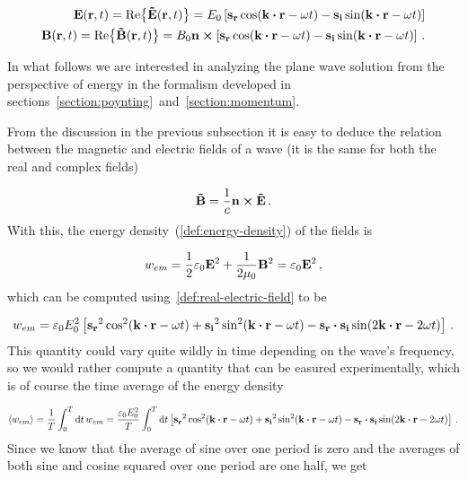 \documentclass[12pt, class=report, crop=false]{standalone}
\begin{document}
\begin{subequations}
  \begin{align}
    \label{def:real-electric-field}
    \vb{E}(\vb{r},t) = \Re{\vb{\tilde{E}}(\vb{r},t)} = E_0 \left[\vb{s_r} \cos(\vb{k}\vdot\vb{r} - \omega t) - \vb{s_i} \sin(\vb{k}\vdot\vb{r} - \omega t) \right] \\
    \vb{B}(\vb{r},t) = \Re{\vb{\tilde{B}}(\vb{r},t)} = B_0 \vb{n}\cp\left[\vb{s_r} \cos(\vb{k}\vdot\vb{r} - \omega t) - \vb{s_i} \sin(\vb{k}\vdot\vb{r} - \omega t) \right] \,.
  \end{align}
\end{subequations}

\par
In what follows we are interested in analyzing the plane wave solution from the perspective of energy in the formalism developed in sections~\ref{section:poynting}~and~\ref{section:momentum}.

\par
From the discussion in the previous subsection it is easy to deduce the relation between the magnetic and electric fields of a wave (it is the same for both the real and complex fields)

\begin{equation}
  \label{othogonality-of-fields}
  \vb{\tilde{B}} = \frac{1}{c} \vb{n}\cp\vb{\tilde{E}} \,.
\end{equation}
With this, the energy density~(\ref{def:energy-density}) of the fields is

\begin{equation}
  w_{em} = \frac{1}{2} \varepsilon_0 \vb{E}^2+ \frac{1}{2\mu_0} \vb{B}^2 = \varepsilon_0 \vb{E}^2 \,,
\end{equation}
which can be computed using~\cref{def:real-electric-field} to be

\begin{equation}
  w_{em} = \varepsilon_0 E_{0}^{2} \left[ \vb{s_r}^2 \cos[2](\vb{k}\vdot\vb{r}-\omega t) + \vb{s_i}^2 \sin[2](\vb{k}\vdot\vb{r}-\omega t) - \vb{s_r}\vdot\vb{s_i} \sin(2\vb{k}\vdot \vb{r} - 2 \omega t) \right] \,.
\end{equation}
This quantity could vary quite wildly in time depending on the wave's frequency, so we would rather compute a quantity that can be easured experimentally, which is of course the time average of the energy density

\begin{equation}
  \expval{w_{em}} = \frac{1}{T} \int_{0}^{T} \dd{t} w_{em} = \frac{\varepsilon_0 E_0^2}{T} \int_{0}^{T} \dd{t} \left[ \vb{s_r}^2 \cos[2](\vb{k}\vdot\vb{r}-\omega t) + \vb{s_i}^2 \sin[2](\vb{k}\vdot\vb{r}-\omega t) - \vb{s_r}\vdot\vb{s_i} \sin(2\vb{k}\vdot \vb{r} - 2 \omega t) \right] \,.
\end{equation}
Since we know that the average of sine over one period is zero and the averages of both sine and cosine squared over one period are one half, we get
\end{document}
